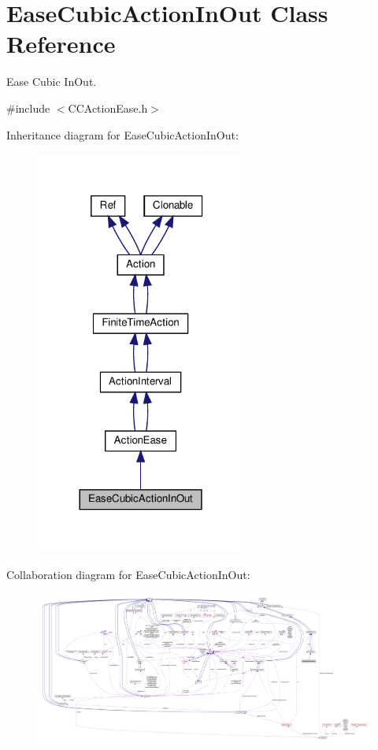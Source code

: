 \hypertarget{classEaseCubicActionInOut}{}\section{Ease\+Cubic\+Action\+In\+Out Class Reference}
\label{classEaseCubicActionInOut}


Ease Cubic In\+Out.  




{\ttfamily \#include $<$C\+C\+Action\+Ease.\+h$>$}



Inheritance diagram for Ease\+Cubic\+Action\+In\+Out\+:
\nopagebreak
\begin{figure}[H]
\begin{center}
\leavevmode
\includegraphics[width=197pt]{classEaseCubicActionInOut__inherit__graph}
\end{center}
\end{figure}


Collaboration diagram for Ease\+Cubic\+Action\+In\+Out\+:
\nopagebreak
\begin{figure}[H]
\begin{center}
\leavevmode
\includegraphics[width=350pt]{classEaseCubicActionInOut__coll__graph}
\end{center}
\end{figure}
